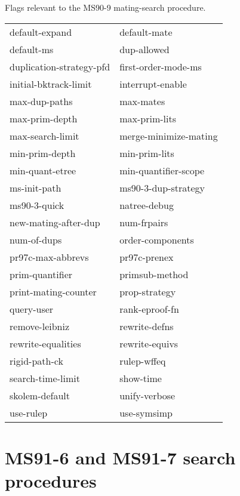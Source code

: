 \begin{description} 
\item[MS90-9]  
Flags relevant to the MS90-9 mating-search procedure.

\begin{tabular}{l l}
default-expand&default-mate\\
default-ms&dup-allowed\\
duplication-strategy-pfd&first-order-mode-ms\\
initial-bktrack-limit&interrupt-enable\\
max-dup-paths&max-mates\\
max-prim-depth&max-prim-lits\\
max-search-limit&merge-minimize-mating\\
min-prim-depth&min-prim-lits\\
min-quant-etree&min-quantifier-scope\\
ms-init-path&ms90-3-dup-strategy\\
ms90-3-quick&natree-debug\\
new-mating-after-dup&num-frpairs\\
num-of-dups&order-components\\
pr97c-max-abbrevs&pr97c-prenex\\
prim-quantifier&primsub-method\\
print-mating-counter&prop-strategy\\
query-user&rank-eproof-fn\\
remove-leibniz&rewrite-defns\\
rewrite-equalities&rewrite-equivs\\
rigid-path-ck&rulep-wffeq\\
search-time-limit&show-time\\
skolem-default&unify-verbose\\
use-rulep&use-symsimp\\
\end{tabular}
\item
\end{description}

\section{MS91-6 and MS91-7 search procedures}

